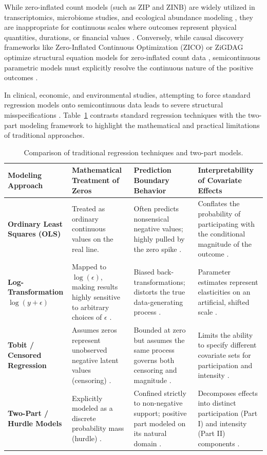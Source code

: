 \documentclass[11pt, a4paper]{article}
\begin{document}
While zero-inflated count models (such as ZIP and ZINB) are widely utilized in transcriptomics, microbiome studies, and ecological abundance modeling \cite{ref12, ref13}, they are inappropriate for continuous scales where outcomes represent physical quantities, durations, or financial values \cite{ref2, ref3, ref4}. Conversely, while causal discovery frameworks like Zero-Inflated Continuous Optimization (ZICO) or ZiGDAG optimize structural equation models for zero-inflated count data \cite{ref12, ref13}, semicontinuous parametric models must explicitly resolve the continuous nature of the positive outcomes \cite{ref1, ref2, ref4}.

In clinical, economic, and environmental studies, attempting to force standard regression models onto semicontinuous data leads to severe structural misspecifications \cite{ref5, ref6}. Table~\ref{tab:regression_comparison} contrasts standard regression techniques with the two-part modeling framework to highlight the mathematical and practical limitations of traditional approaches.

\begin{table}[htbp]
\centering
\small
\caption{Comparison of traditional regression techniques and two-part models.}
\label{tab:regression_comparison}
\begin{tabularx}{\textwidth}{l p{3.2cm} p{3.2cm} X}
\toprule
\textbf{Modeling Approach} & \textbf{Mathematical Treatment of Zeros} & \textbf{Prediction Boundary Behavior} & \textbf{Interpretability of Covariate Effects} \\
\midrule
\textbf{Ordinary Least Squares (OLS)} \cite{ref4, ref5} & Treated as ordinary continuous values on the real line. & Often predicts nonsensical negative values; highly pulled by the zero spike \cite{ref5}. & Conflates the probability of participating with the conditional magnitude of the outcome \cite{ref5}. \\
\addlinespace
\textbf{Log-Transformation} $\log(y + \epsilon)$ \cite{ref5} & Mapped to $\log(\epsilon)$, making results highly sensitive to arbitrary choices of $\epsilon$ \cite{ref5}. & Biased back-transformations; distorts the true data-generating process \cite{ref5, ref6}. & Parameter estimates represent elasticities on an artificial, shifted scale \cite{ref5, ref14}. \\
\addlinespace
\textbf{Tobit / Censored Regression} \cite{ref2} & Assumes zeros represent unobserved negative latent values (censoring) \cite{ref2}. & Bounded at zero but assumes the same process governs both censoring and magnitude \cite{ref2}. & Limits the ability to specify different covariate sets for participation and intensity \cite{ref2}. \\
\addlinespace
\textbf{Two-Part / Hurdle Models} \cite{ref1, ref2, ref4} & Explicitly modeled as a discrete probability mass (hurdle) \cite{ref1, ref4}. & Confined strictly to non-negative support; positive part modeled on its natural domain \cite{ref1, ref4, ref15}. & Decomposes effects into distinct participation (Part I) and intensity (Part II) components \cite{ref5, ref7, ref8}. \\
\bottomrule
\end{tabularx}
\end{table}
\end{document}
